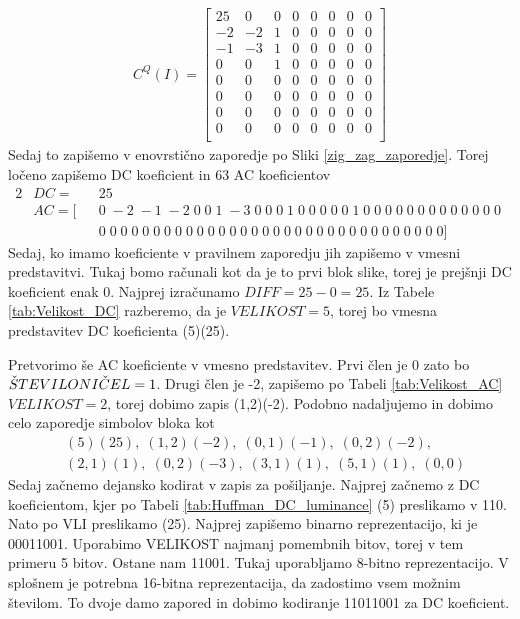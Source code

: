 \documentclass[a4paper,12pt,openright]{book}
\begin{document}
\begin{gather*}
 C^Q(I) =
  \begin{bmatrix}
 25&  0&  0&  0&  0&  0&  0&  0\\
 -2& -2&  1&  0&  0&  0&  0&  0\\
 -1& -3&  1&  0&  0&  0&  0&  0\\
  0&  0&  1&  0&  0&  0&  0&  0\\
  0&  0&  0&  0&  0&  0&  0&  0\\
  0&  0&  0&  0&  0&  0&  0&  0\\
  0&  0&  0&  0&  0&  0&  0&  0\\
  0&  0&  0&  0&  0&  0&  0&  0\\
   \end{bmatrix}
\end{gather*}
Sedaj to zapišemo v enovrstično zaporedje po Sliki \ref{zig_zag_zaporedje}. Torej ločeno zapišemo DC koeficient in 63 AC koeficientov
\begin{alignat*}{2}
    &DC = && 25 \\
    &AC = [&&0\;-2\;-1\;-2\;0\;0\;1\;-3\;0\;0\;0\;1\;0\;0\;0\;0\;
           0\;1\;0\;0\;0\;0\;0\;0\;0\;0\;0\;0\;0\;0\;0\;\\
    &      &&0\;0\;0\;0\;0\;0\;0\;0\;0\;0\;0\;0\;0\;0\;0\;0\;
           0\;0\;0\;0\;0\;0\;0\;0\;0\;0\;0\;0\;0\;0\;0\;0]
\end{alignat*}
Sedaj, ko imamo koeficiente v pravilnem zaporedju jih zapišemo v vmesni predstavitvi. Tukaj bomo računali kot da je to prvi blok slike, torej je prejšnji DC koeficient enak 0. Najprej izračunamo $DIFF = 25-0 = 25$. Iz Tabele \ref{tab:Velikost_DC} razberemo, da je $VELIKOST = 5$, torej bo vmesna predstavitev DC koeficienta (5)(25). \par
Pretvorimo še AC koeficiente v vmesno predstavitev. Prvi člen je 0 zato bo $\Check{S}TEVILONI\Check{C}EL=1$. Drugi člen je -2, zapišemo po Tabeli \ref{tab:Velikost_AC} $VELIKOST = 2$, torej dobimo zapis (1,2)(-2). Podobno nadaljujemo in dobimo celo zaporedje simbolov bloka kot
\begin{equation*}
  \begin{aligned}
    &(5)(25),\;(1,2)(-2),\;(0,1)(-1),\;(0,2)(-2),\\
    &(2,1)(1),\;(0,2)(-3),\;(3,1)(1),\;(5,1)(1),\;(0,0)
  \end{aligned}
\end{equation*}
Sedaj začnemo dejansko kodirat v zapis za pošiljanje. Najprej začnemo z DC koeficientom, kjer po Tabeli \ref{tab:Huffman_DC_luminance} (5) preslikamo v 110. Nato po VLI preslikamo (25). Najprej zapišemo binarno reprezentacijo, ki je 00011001. Uporabimo VELIKOST najmanj pomembnih bitov, torej v tem primeru 5 bitov. Ostane nam 11001. Tukaj uporabljamo 8-bitno reprezentacijo. V splošnem je potrebna 16-bitna reprezentacija, da zadostimo vsem možnim številom. To dvoje damo zapored in dobimo kodiranje 11011001 za DC koeficient.\par
\end{document}
